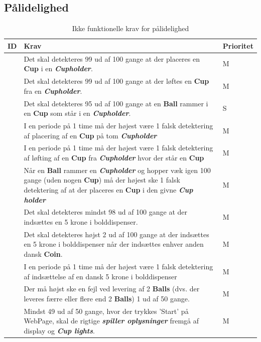 \documentclass[Kravspecifikation/Kravspec_Main.tex]{subfiles}
\begin{document}
\subsection{Pålidelighed}
\begin{table}[H]
\centering
\begin{tabular}{|L{0.1\textwidth}|L{0.65\textwidth}|L{0.15\textwidth}|}
\hline
\textbf{ID} & \textbf{Krav} & \textbf{Prioritet} \\ \hline
\subreq{} \label{req:placed-succes-rate} & Det skal detekteres 99 ud af 100 gange at der placeres en \textbf{Cup} i en \textit{\textbf{Cupholder}}.  & M \\ \hline
\subreq{} \label{req:removed-succes-rate} & Det skal detekteres 99 ud af 100 gange at der løftes en \textbf{Cup} fra en \textit{\textbf{Cupholder}}.  & M \\ \hline
\subreq{} \label{req:dropped-succes-rate} & Det skal detekteres 95 ud af 100 gange at en \textbf{Ball} rammer i  en \textbf{Cup} som står i en \textit{\textbf{Cupholder}}. & S \\ \hline
\subreq{} \label{req:hour-false-placed} & I en periode på 1 time må der højest være 1 falsk detektering af placering af en \textbf{Cup} på tom \textit{\textbf{Cupholder}} & M \\ \hline
\subreq{} \label{req:hour-false-removed}& I en periode på 1 time må der højest være 1 falsk detektering af løfting af en \textbf{Cup} fra \textit{\textbf{Cupholder}} hvor der står en \textbf{Cup}& M \\ \hline
\subreq{} \label{req:ball-hit-sensor-false-placed} & Når en \textbf{Ball} rammer en \textit{\textbf{Cupholder}} og hopper væk igen 100 gange (uden nogen \textbf{Cup}) må der højest ske 1 falsk detektering af at der placeres en \textbf{Cup} i den givne \textit{\textbf{Cup holder}}& M \\ \hline
\subreq{} \label{req:inserted-coin-succes-rate} & Det skal detekteres mindst 98 ud af 100 gange at der indsættes en 5 krone i bolddispenser. & M \\ \hline
\subreq{} \label{req:inserted-wrong-coin-false-detect} & Det skal detekteres højst 2 ud af 100 gange at der indsættes en 5 krone i bolddispenser når der indsættes enhver anden dansk \textbf{Coin}. & M \\ \hline
\subreq{} \label{req:hour-false-coin} & I en periode på 1 time må der højest være 1 falsk detektering af indsættelse af en dansk 5 krone i bolddispenser & M \\ \hline
\subreq{} \label{req:ball-delivery-error-count} & Der må højst ske en fejl ved levering af 2 \textbf{Balls} (dvs. der leveres færre eller flere end 2 \textbf{Balls}) 1 ud af 50 gange.  & M \\ \hline
\subreq{} \label{req:webpage-error-rate}& Mindst 49 ud af 50 gange, hvor der trykkes 'Start' på WebPage, skal de rigtige \textit{\textbf{spiller oplysninger}} fremgå af display og \textit{\textbf{Cup lights}}. & M\\ \hline
\end{tabular}
\caption{Ikke funktionelle krav for pålidelighed}
\label{tab:reliability}
\end{table}
\end{document}
